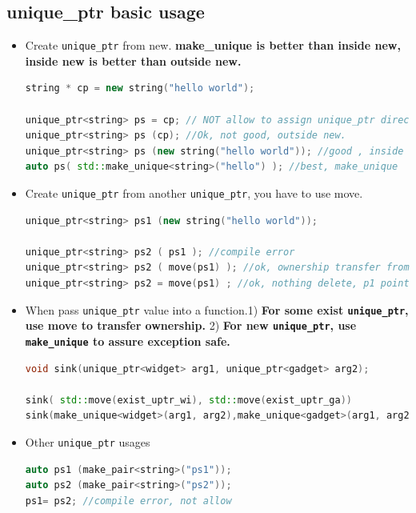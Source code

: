 \documentclass[a4paper,11pt,twoside]{book}
\begin{document}
\subsection{unique\_ptr basic usage}
\begin{itemize}

\item Create \texttt{unique\_ptr} from new. \textbf{make\_unique is better than inside new, inside new is better than outside new.}
\begin{lstlisting}[frame=single, language=c++]
string * cp = new string("hello world");

unique_ptr<string> ps = cp; // NOT allow to assign unique_ptr directly.
unique_ptr<string> ps (cp); //Ok, not good, outside new. 
unique_ptr<string> ps (new string("hello world")); //good , inside new
auto ps( std::make_unique<string>("hello") ); //best, make_unique 
\end{lstlisting}

\item Create \texttt{unique\_ptr} from another \texttt{unique\_ptr}, you have to use move.
\begin{lstlisting}[frame=single, language=c++]
unique_ptr<string> ps1 (new string("hello world"));

unique_ptr<string> ps2 ( ps1 ); //compile error
unique_ptr<string> ps2 ( move(ps1) ); //ok, ownership transfer from p1 to p2
unique_ptr<string> ps2 = move(ps1) ; //ok, nothing delete, p1 points to nullptr
\end{lstlisting}

\item When pass \texttt{unique\_ptr} value into a function.1) \textbf{For some exist \texttt{unique\_ptr}, use move to transfer ownership.} 2) \textbf{For new \texttt{unique\_ptr}, use \texttt{make\_unique} to assure exception safe.}	


\begin{lstlisting}[frame=single, language=c++]
void sink(unique_ptr<widget> arg1, unique_ptr<gadget> arg2);

sink( std::move(exist_uptr_wi), std::move(exist_uptr_ga))
sink(make_unique<widget>(arg1, arg2),make_unique<gadget>(arg1, arg2));  
\end{lstlisting}


\item Other \texttt{unique\_ptr} usages
\begin{lstlisting}[frame=single, language=c++]
auto ps1 (make_pair<string>("ps1"));
auto ps2 (make_pair<string>("ps2"));
ps1= ps2; //compile error, not allow


\end{lstlisting}
\end{itemize}
\end{document}
